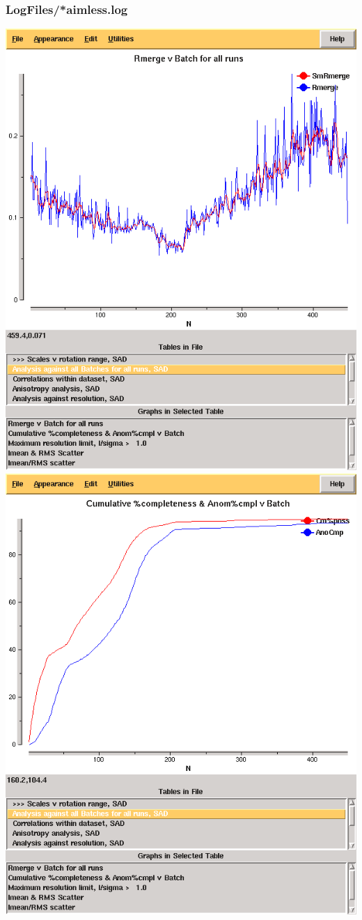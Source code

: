 \documentclass[slides,compress]{beamer}
\begin{document}
\begin{frame}
\frametitle{LogFiles/*aimless.log}
\includegraphics[scale=0.25]{figures/3qrn-all-rmerge-aimless.png}
\includegraphics[scale=0.25]{figures/3qrn-all-complete-aimless.png}
\end{frame}
\end{document}
